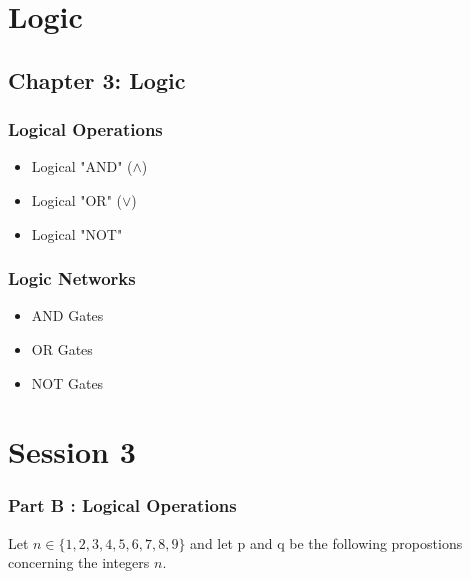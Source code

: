 \documentclass[]{report}
\begin{document}
\chapter{Logic}

\section{Chapter 3: Logic}



\subsection{Logical Operations}

\begin{itemize}
	\item Logical "AND" ($\wedge$)
	\item Logical "OR" ($\vee$)
	\item Logical "NOT" 
\end{itemize}
\newpage

\subsection*{Logic Networks}
\begin{itemize}
	\item AND Gates
	\item OR Gates
	\item NOT Gates
\end{itemize}

\newpage


\chapter{Session 3}


\subsection*{Part B : Logical Operations}
Let $n \in \{1,2,3,4,5,6,7,8,9\}$ and let p and q be the following propostions concerning 
the integers $n$.
\end{document}
